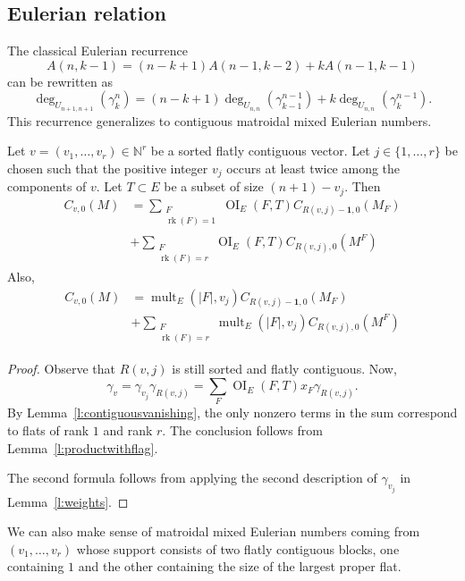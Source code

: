 \documentclass[ALCO,published]{cedram}
\numberwithin{equation}{section}
\numberwithin{figure}{section}
\newcommand{\N}{\mathbb{N}}
\DeclareMathOperator{\OI}{OI}
\DeclareMathOperator{\mult}{mult}
\DeclareMathOperator{\rk}{rk}
\begin{document}
\subsection{Eulerian relation}

The classical Eulerian recurrence
\[ A(n,k-1) = (n-k+1)A(n-1,k-2) + kA(n-1,k-1) \]
can be rewritten as
\[ \deg_{U_{n+1,n+1}}(\gamma_k^n) = (n-k+1) \deg_{U_{n,n}}(\gamma_{k-1}^{n-1}) + k \deg_{U_{n,n}}(\gamma_k^{n-1}). \]
This recurrence generalizes to contiguous matroidal mixed Eulerian numbers.

\begin{prop} \label{p:eulerianrelation}
  Let $v=(v_1,\dots,v_r)\in\N^r$ be a sorted flatly contiguous vector. Let $j\in\{1,\dots,r\}$ be chosen such that the positive integer $v_j$ occurs at least twice among the components of $v$.
  Let $T\subset E$ be a subset of size $(n+1)-v_j$. Then
  \begin{align*}
  C_{v,0}(M)&=\sum_{\substack{F\\\rk(F)=1}} \OI_{E}(F,T) C_{R(v,j)-\mathbf{1},0}(M_F)\\
  &+\sum_{\substack{F\\\rk(F)=r}} \OI_{E}(F,T)C_{R(v,j),0}(M^F)
   \end{align*}
   Also,
\begin{align*}
  C_{v,0}(M)&=\mult_{E}(|F|,v_j)C_{R(v,j)-\mathbf{1},0}(M_F)\\
  &+\sum_{\substack{F\\\rk(F)=r}}\mult_{E}(|F|,v_j)C_{R(v,j),0}(M^F)       
\end{align*}
\end{prop}

\begin{proof}
  Observe that $R(v,j)$ is still sorted and flatly contiguous. 
  Now, 
  \[\gamma_v=\gamma_{v_j}\gamma_{R(v,j)}=\sum_F \OI_{E}(F,T)x_F\gamma_{R(v,j)}.\]
  By Lemma~\ref{l:contiguousvanishing}, the only nonzero terms in the sum correspond to flats of rank $1$ and rank $r$. The conclusion follows from Lemma~\ref{l:productwithflag}.

  The second formula follows from applying the second description of $\gamma_{v_j}$ in Lemma~\ref{l:weights}.
\end{proof}


We can also make sense of matroidal mixed Eulerian numbers coming from $(v_1,\dots,v_r)$ whose support consists of two flatly contiguous blocks, one containing $1$ and the other containing the size of the largest proper flat.
\end{document}
